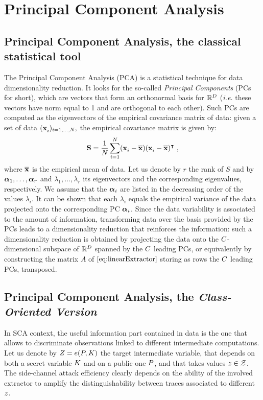 \section{Principal Component Analysis}\label{sec:PCA}
%
%
\subsection{Principal Component Analysis, the classical statistical tool}
The Principal Component Analysis (PCA) \cite{fisher1938statistical} is a statistical technique for data dimensionality reduction. It looks for the so-called {\em Principal Components} (PCs for short), which are vectors that form an orthonormal basis for $\mathbb{R}^\traceLength$ (\textit{i.e.} these vectors have norm equal to 1 and are orthogonal to each other). Such PCs are computed as the eigenvectors of the empirical covariance matrix of data: given a set of data $(\sss[]{i})_{i=1,\dots,\numTraces[]},$ the empirical covariance matrix is given by:
\begin{equation}\label{eq:covmat}
\covmat = \frac{1}{\numTraces[]} \sum_{i=1}^{\numTraces[]}(\sss[]{i} - \mmmX)(\sss[]{i} - \mmmX)^\intercal \mbox{ ,}
\end{equation}
 where $\mmmX$ is the empirical mean of data. Let us denote by $r$ the rank of $S$ and by $\AAlpha_1, \dots, \AAlpha_r$ and $\lambda_1, \dots, \lambda_r$ its eigenvectors and the corresponding eigenvalues, respectively. We assume that the $\AAlpha_i$ are listed in the decreasing order of the values $\lambda_i$. It can be shown that each $\lambda_i$ equals the empirical variance of the data projected onto the corresponding PC $\AAlpha_i$. Since the data variability is associated to the amount of information, transforming data over the basis provided by the PCs leads to a dimensionality reduction that reinforces the information: such a dimensionality reduction is obtained by projecting the data onto the  $\newTraceLength$-dimensional subspace of $\mathbb{R}^\traceLength$ spanned by the $\newTraceLength$ leading PCs, or equivalently by constructing the matrix $A$ of $\eqref{eq:linearExtractor}$ storing as rows the $\newTraceLength$ leading PCs, transposed.\\

\subsection{Principal Component Analysis, the {\em Class-Oriented Version}}\label{sec:PCA_classes}
In SCA context, the useful information part contained in data is the one that allows to discriminate observations linked to different intermediate computations. Let us denote by $\sensRandVar = \targetFunction(\randPlaintext,\randKey)$ the target intermediate variable, that depends on both a secret variable $\randKey$ and on a public one $\randPlaintext$, and that takes values $\sensVar \in \sensVarSet$. The side-channel attack efficiency clearly depends on the ability of the involved extractor to amplify the distinguishability between traces associated to different $\sensVar$.\\

